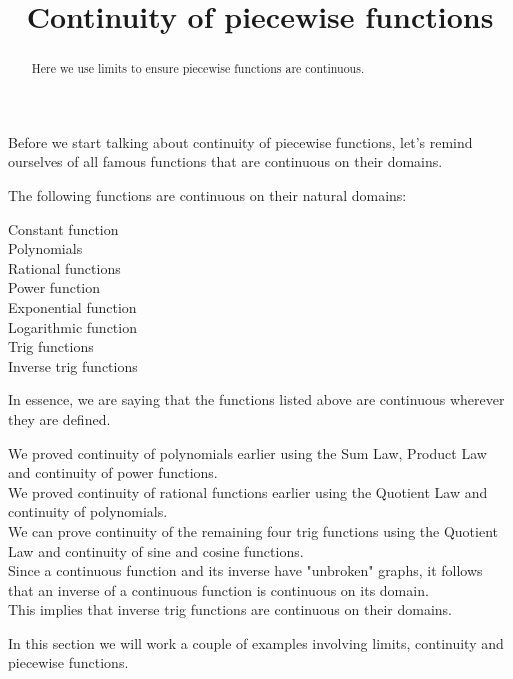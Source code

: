 \documentclass{ximera}
\title[Dig-In:]{Continuity of piecewise functions}
\begin{document}
\begin{abstract}
Here we use limits to ensure piecewise functions are continuous.
\end{abstract}
\maketitle
Before we start talking about continuity of piecewise functions, let's remind ourselves of all famous functions that are continuous on their domains.
\begin{theorem}\label{theorem:continuity}
The following functions are continuous on their natural domains:
\begin{description}
\item[Constant function]
\item[Polynomials]
\item[Rational functions]
\item[Power function]
\item[Exponential function] 
\item[Logarithmic function] 
\item[Trig functions]  
\item[Inverse trig functions]     
\end{description}
In essence, we are saying that the functions listed above are
continuous wherever they are defined.

We  proved continuity of polynomials earlier using the Sum Law, Product Law and continuity of power functions.\\
We  proved continuity of rational functions earlier using the Quotient Law and  continuity of polynomials.\\
We can  prove continuity of the remaining four trig functions using the Quotient Law and continuity of sine and cosine functions.\\

Since a continuous function and its inverse have "unbroken" graphs, it follows that an inverse of a continuous function is continuous on its domain.\\
This implies that inverse trig functions are continuous on their domains. \\

\end{theorem}
In this section we will work a couple of examples involving limits,
continuity and piecewise functions.
\end{document}
